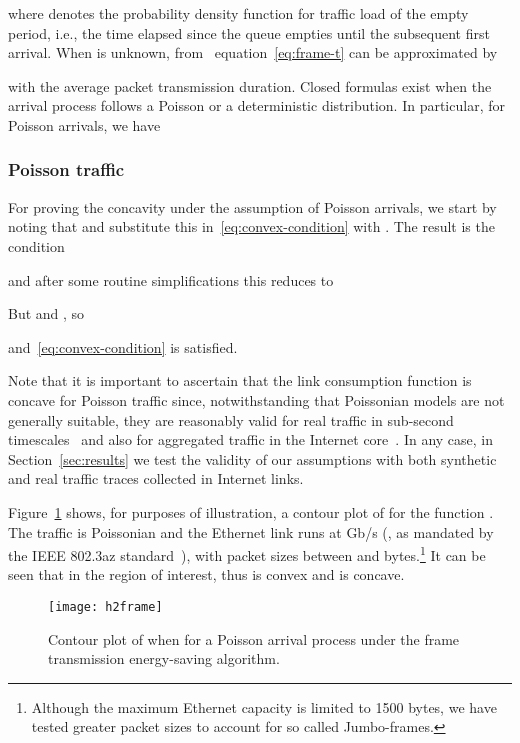 \documentclass[journal,english,twocolumn,10pt,letterpaper]{IEEEtran}
\newcommand{\added}[1]{{#1}}
\newcommand{\addedfragile}[1]{{#1}}
\begin{document}
where  denotes the probability density function for traffic
load  of the empty period, i.e., the time elapsed since the queue
empties until the subsequent first arrival. When  is unknown,
\added{from~\cite{herreria12:_gi_g_model_gb_energ_effic_ether}}
equation~\eqref{eq:frame-t} can be approximated by

with  the average packet transmission duration. Closed formulas
exist when the arrival process follows a Poisson or a deterministic
distribution. In particular, for Poisson arrivals, we have


\subsubsection{Poisson traffic}
\label{sec:poisson-traffic}

For proving the concavity under the assumption of Poisson arrivals, we start
by noting that  and substitute
this in~\eqref{eq:convex-condition} with . The result is the
condition

and after some routine simplifications this reduces to

But  and , so

and~\eqref{eq:convex-condition} is satisfied.

Note that it is important to ascertain that the link consumption function
 is concave for Poisson traffic since, notwithstanding that
Poissonian models are not generally suitable, they are reasonably valid for
real traffic in sub-second timescales~\cite{Karagiannis04} and also for
aggregated traffic in the Internet core~\cite{Vishwanath09}. In any case, in
Section~\ref{sec:results} we test the validity of our assumptions with both
synthetic and real traffic traces collected in Internet links.

Figure~\ref{fig:numerical} shows, for purposes of illustration, a contour plot
of  for the function
.
The traffic is Poissonian and the Ethernet link runs at  Gb/s
(\mu\mu, as mandated by the
IEEE 802.3az standard~\cite{802.3az}), with packet sizes between  and
 bytes.\added{\footnote{\addedfragile{Although the maximum Ethernet
      capacity is limited to 1500 bytes, we have tested greater packet sizes
      to account for so called Jumbo-frames.}}} It can be seen that
 in the region of interest, thus  is
convex and
 is concave.

\begin{figure}
  \centering
  \texttt{[image: h2frame]}
  \caption{\label{fig:numerical} Contour plot of  when
     for a Poisson arrival process under the frame
    transmission energy-saving algorithm.}
\end{figure}
\end{document}
